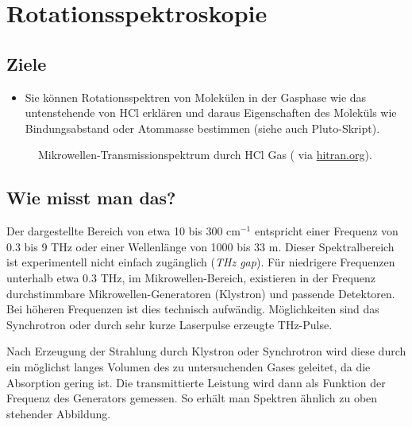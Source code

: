 \renewcommand{\chapterauthors}{Markus Lippitz}
\renewcommand{\lastmod}{7. November 2021}


\chapter{Rotationsspektroskopie}



\section{Ziele}

\begin{itemize}
\item Sie können Rotationsspektren von Molekülen in der Gasphase wie das untenstehende von HCl erklären und daraus Eigenschaften des Moleküls wie Bindungsabstand oder Atommasse bestimmen  (siehe auch Pluto-Skript).
\end{itemize}



\begin{figure}
\caption{Mikrowellen-Transmissionspektrum durch  HCl Gas  (\cite{Li_2011_hcl} via \href{https://hitran.org}{hitran.org}).
\label{fig:rot_hcl}}
\end{figure}



\section{Wie misst man das?}

Der dargestellte Bereich  von etwa 10 bis 300 cm$^{-1}$ entspricht einer Frequenz von 0.3 bis 9 THz oder einer Wellenlänge von 1000 bis 33 \textmu m. Dieser Spektralbereich ist experimentell nicht einfach zugänglich (\emph{THz gap}). Für niedrigere Frequenzen unterhalb etwa 0.3 THz, im Mikrowellen-Bereich, existieren in der Frequenz durchstimmbare  Mikrowellen-Generatoren (Klystron) und passende Detektoren. Bei höheren Frequenzen ist dies technisch aufwändig. Möglichkeiten sind das Synchrotron oder durch sehr kurze Laserpulse erzeugte THz-Pulse.

Nach Erzeugung der Strahlung durch Klystron oder Synchrotron wird diese durch ein möglichst langes Volumen des zu untersuchenden Gases geleitet, da die Absorption gering ist. Die transmittierte Leistung wird dann als Funktion der Frequenz des Generators gemessen. So erhält man  Spektren ähnlich zu oben stehender Abbildung.

